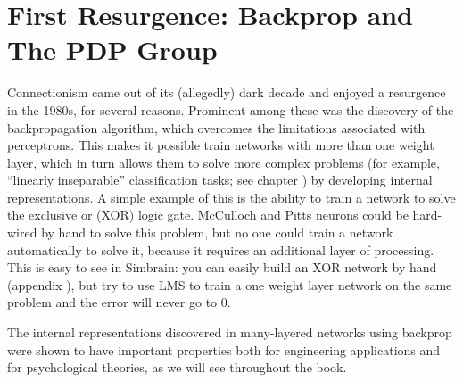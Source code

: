 \section{First Resurgence: Backprop and The PDP Group}\label{first_resurgence}


Connectionism came out of its (allegedly) dark decade and enjoyed a resurgence in the 1980s, for several reasons. Prominent among these was the discovery of the backpropagation algorithm, which overcomes the limitations associated with perceptrons. This makes it possible train networks with more than one weight layer, which in turn allows them to solve more complex problems (for example, ``linearly inseparable'' classification tasks; see chapter ) by developing internal representations. A simple example of this is the ability to train a network to solve the exclusive or (XOR) logic gate. McCulloch and Pitts neurons could be hard-wired by hand to solve this problem, but no one could train a network automatically to solve it, because it requires an additional layer of processing. This is easy to see in Simbrain: you can easily build an XOR network by hand (appendix  ), but try to use LMS to train a one weight layer network on the same problem and the error will never go to 0. 

The internal representations discovered in many-layered networks using backprop were shown to have important properties both for engineering applications and for psychological theories, as we will see throughout the book.



